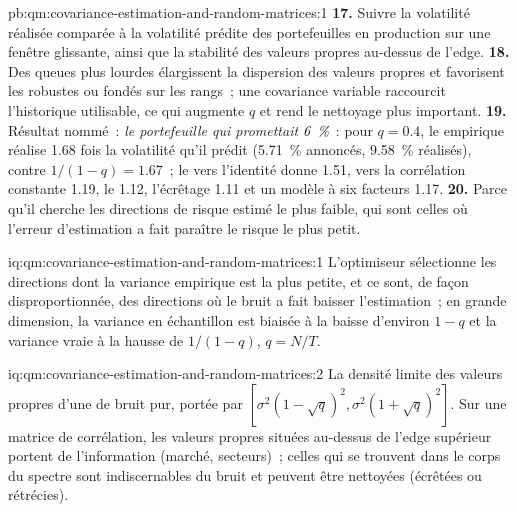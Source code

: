 \begin{solution}{pb:qm:covariance-estimation-and-random-matrices:1}
\textbf{17.} Suivre la volatilité réalisée comparée à la volatilité prédite des portefeuilles en production sur une fenêtre glissante, ainsi que la stabilité des valeurs propres au-dessus de l'edge.
\textbf{18.} Des queues plus lourdes élargissent la dispersion des valeurs propres et favorisent les  robustes ou fondés sur les rangs~; une covariance variable raccourcit l'historique utilisable, ce qui augmente $q$ et rend le nettoyage
plus important.
\textbf{19.} Résultat nommé~: \emph{le portefeuille qui promettait 6~\%}~: pour $q = 0.4$, le  empirique réalise 1.68 fois la volatilité qu'il prédit (5.71~\% annoncés, 9.58~\%
réalisés), contre $1/(1 - q) = 1.67$~; le  vers l'identité donne 1.51, vers la corrélation constante 1.19, le  1.12, l'écrêtage 1.11 et un modèle à six facteurs 1.17.
\textbf{20.} Parce qu'il cherche les directions de risque estimé le plus faible, qui sont celles où l'erreur d'estimation a fait paraître le risque le plus petit.
\end{solution}

\begin{solution}{iq:qm:covariance-estimation-and-random-matrices:1}
L'optimiseur sélectionne les directions dont la variance empirique est la plus petite, et ce sont, de façon disproportionnée, des directions où le bruit a fait baisser l'estimation~; en grande dimension, la
variance en échantillon est biaisée à la baisse d'environ $1 - q$ et la variance vraie à la hausse de $1/(1 - q)$, $q = N/T$.
\end{solution}

\begin{solution}{iq:qm:covariance-estimation-and-random-matrices:2}
La densité limite des valeurs propres d'une  de bruit pur, portée par $[\sigma^2(1 - \sqrt q)^2, \sigma^2(1 + \sqrt q)^2]$. Sur une matrice de corrélation, les valeurs propres
situées au-dessus de l'edge supérieur portent de l'information (marché, secteurs)~; celles qui se trouvent dans le corps du spectre sont indiscernables du bruit et peuvent être nettoyées (écrêtées ou rétrécies).
\end{solution}

